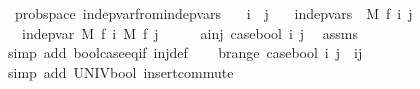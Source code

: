 \begin{isabellebody}
\isamarkupfalse%
%
\endisatagproof
{\isafoldproof}%
%
\isadelimproof
\isanewline
%
\endisadelimproof
\isanewline
{}\isamarkupfalse%
\ {\isacharparenleft}{\kern0pt}\ prob{\isacharunderscore}{\kern0pt}space{\isacharparenright}{\kern0pt}\ indep{\isacharunderscore}{\kern0pt}var{\isacharunderscore}{\kern0pt}from{\isacharunderscore}{\kern0pt}indep{\isacharunderscore}{\kern0pt}vars{\isacharcolon}{\kern0pt}\isanewline
\ \ \ {\isachardoublequoteopen}i\ {\isasymnoteq}\ j{\isachardoublequoteclose}\isanewline
\ \ \ {\isachardoublequoteopen}indep{\isacharunderscore}{\kern0pt}vars\ {\isacharparenleft}{\kern0pt}{\isasymlambda}{\isacharunderscore}{\kern0pt}{\isachardot}{\kern0pt}\ M{\isacharprime}{\kern0pt}{\isacharparenright}{\kern0pt}\ f\ {\isacharbraceleft}{\kern0pt}i{\isacharcomma}{\kern0pt}\ j{\isacharbraceright}{\kern0pt}{\isachardoublequoteclose}\ \isanewline
\ \ \ {\isachardoublequoteopen}indep{\isacharunderscore}{\kern0pt}var\ M{\isacharprime}{\kern0pt}\ {\isacharparenleft}{\kern0pt}f\ i{\isacharparenright}{\kern0pt}\ M{\isacharprime}{\kern0pt}\ {\isacharparenleft}{\kern0pt}f\ j{\isacharparenright}{\kern0pt}{\isachardoublequoteclose}\isanewline
%
\isadelimproof
%
\endisadelimproof
%
\isatagproof
{}\isamarkupfalse%
\ {\isacharminus}{\kern0pt}\isanewline
\ \ \isamarkupfalse%
\ a{\isacharcolon}{\kern0pt}{\isachardoublequoteopen}inj\ {\isacharparenleft}{\kern0pt}case{\isacharunderscore}{\kern0pt}bool\ i\ j{\isacharparenright}{\kern0pt}{\isachardoublequoteclose}\ \isamarkupfalse%
\ assms{\isacharparenleft}{\kern0pt}{}{\isacharparenright}{\kern0pt}\ \isanewline
\ \ \ \ \isamarkupfalse%
\ {\isacharparenleft}{\kern0pt}simp\ add{\isacharcolon}{\kern0pt}\ bool{\isachardot}{\kern0pt}case{\isacharunderscore}{\kern0pt}eq{\isacharunderscore}{\kern0pt}if\ inj{\isacharunderscore}{\kern0pt}def{\isacharparenright}{\kern0pt}\isanewline
\ \ \isamarkupfalse%
\ b{\isacharcolon}{\kern0pt}{\isachardoublequoteopen}range\ {\isacharparenleft}{\kern0pt}case{\isacharunderscore}{\kern0pt}bool\ i\ j{\isacharparenright}{\kern0pt}\ {\isacharequal}{\kern0pt}\ {\isacharbraceleft}{\kern0pt}i{\isacharcomma}{\kern0pt}j{\isacharbraceright}{\kern0pt}{\isachardoublequoteclose}\ \isanewline
\ \ \ \ \isamarkupfalse%
\ {\isacharparenleft}{\kern0pt}simp\ add{\isacharcolon}{\kern0pt}\ UNIV{\isacharunderscore}{\kern0pt}bool\ insert{\isacharunderscore}{\kern0pt}commute{\isacharparenright}{\kern0pt}\isanewline

\end{isabellebody}
